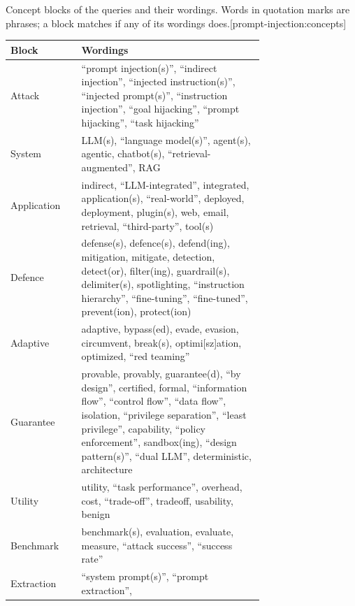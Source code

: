 \begin{table}[tbp]
  \begin{sidecaption}{Concept blocks of the queries and their wordings.
    Words in quotation marks are phrases; a block matches if any of its
    wordings does.}[prompt-injection:concepts]
    \centering\footnotesize
    \begin{tabular}{@{}lp{0.72\linewidth}@{}}
      \toprule
      Block & Wordings \\
      \midrule
      Attack & \enquote{prompt injection(s)}, \enquote{indirect injection},
        \enquote{injected instruction(s)}, \enquote{injected prompt(s)},
        \enquote{instruction injection}, \enquote{goal hijacking},
        \enquote{prompt hijacking}, \enquote{task hijacking} \\
      System & LLM(s), \enquote{language model(s)}, agent(s), agentic,
        chatbot(s), \enquote{retrieval-augmented}, RAG \\
      Application & indirect, \enquote{LLM-integrated}, integrated,
        application(s), \enquote{real-world}, deployed, deployment,
        plugin(s), web, email, retrieval, \enquote{third-party}, tool(s) \\
      Defence & defense(s), defence(s), defend(ing), mitigation, mitigate,
        detection, detect(or), filter(ing), guardrail(s), delimiter(s),
        spotlighting, \enquote{instruction hierarchy}, \enquote{fine-tuning},
        \enquote{fine-tuned}, prevent(ion), protect(ion) \\
      Adaptive & adaptive, bypass(ed), evade, evasion, circumvent, break(s),
        optimi[sz]ation, optimized, \enquote{red teaming} \\
      Guarantee & provable, provably, guarantee(d), \enquote{by design},
        certified, formal, \enquote{information flow}, \enquote{control
        flow}, \enquote{data flow}, isolation, \enquote{privilege
        separation}, \enquote{least privilege}, capability,
        \enquote{policy enforcement}, sandbox(ing), \enquote{design
        pattern(s)}, \enquote{dual LLM}, deterministic, architecture \\
      Utility & utility, \enquote{task performance}, overhead, cost,
        \enquote{trade-off}, tradeoff, usability, benign \\
      Benchmark & benchmark(s), evaluation, evaluate, measure,
        \enquote{attack success}, \enquote{success rate} \\
      Extraction & \enquote{system prompt(s)}, \enquote{prompt extraction},

\end{tabular}
\end{sidecaption}
\end{table}
